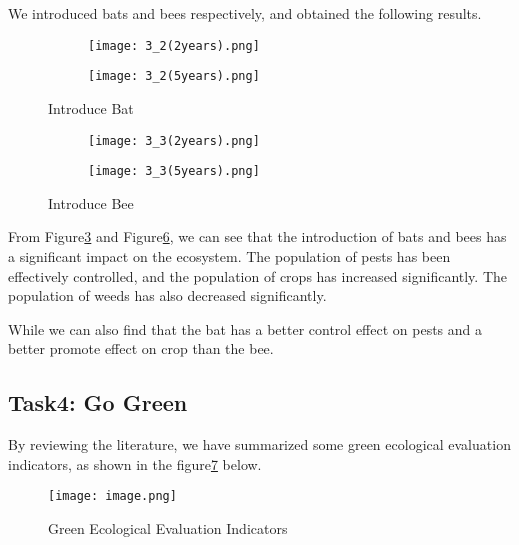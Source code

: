 \documentclass[12pt]{article}  %
\begin{document}
We introduced bats and bees respectively, and obtained the
 following results.

\begin{figure}[h]
    \centering
    \begin{subfigure}[b]{.4\textwidth}
        \texttt{[image: 3\_2(2years).png]}
        \label{subfigure:3-2(2years)}
    \end{subfigure}
    \begin{subfigure}[b]{.4\textwidth}
        \texttt{[image: 3\_2(5years).png]}
        \label{subfig:3-2(5years)}
    \end{subfigure}
    \caption{Introduce Bat}\label{fig:FarmModel-V3.2}
    \end{figure}

\begin{figure}[h]
    \centering
    \begin{subfigure}[b]{.4\textwidth}
        \texttt{[image: 3\_3(2years).png]}
        \label{subfigure:3-3(2years)}
    \end{subfigure}
    \begin{subfigure}[b]{.4\textwidth}
        \texttt{[image: 3\_3(5years).png]}
        \label{subfig:3-3(5years)}
    \end{subfigure}
    \caption{Introduce Bee}\label{fig:FarmModel-V3.3}
    \end{figure}

From Figure\ref{fig:FarmModel-V3.2} and 
Figure\ref{fig:FarmModel-V3.3}, we can see that the 
introduction of bats and bees has a significant impact 
on the ecosystem. The population of pests has been 
effectively controlled, and the population of crops 
has increased significantly. The population of weeds 
has also decreased significantly.

While we can also find that the bat has a better
control effect on pests and a better promote effect on 
crop than the bee.

\subsection{Task4: Go Green}
By reviewing the literature, we have summarized some green ecological 
evaluation indicators, as shown in the figure\ref{fig:Green Ecological Evaluation Indicators} below.

\begin{figure}[h]
    \centering
    \texttt{[image: image.png]}
    \caption{Green Ecological Evaluation Indicators}
    \label{fig:Green Ecological Evaluation Indicators}
\end{figure}
\end{document}
